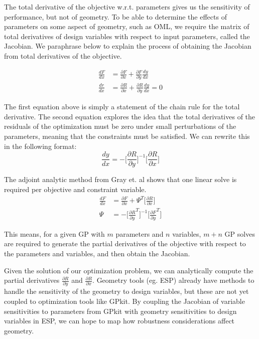 \documentclass[journal]{new-aiaa}
\begin{document}
The total derivative of the objective w.r.t. parameters gives us the sensitivity of performance,
but not of geometry. To be able to determine the effects of parameters on some aspect of geometry,
such as OML, we require the matrix of total derivatives of design variables with respect to input parameters,
called the Jacobian. We paraphrase \cite{Martins2013} below to explain
the process of obtaining the Jacobian from total derivatives of the objective. 

\begin{equation}
\begin{split}
\frac{dF}{dx} &= \frac{\partial F}{\partial x} + \frac{\partial F}{\partial y} \frac{dy}{dx}  \\ 
\frac{dr}{dx} &= \frac{\partial R}{\partial x} + \frac{\partial R}{\partial y} \frac{dy}{dx} = 0
\end{split}
\end{equation}

The first equation above is simply a statement of the chain rule for 
the total derivative. The second equation
explores the idea that the total derivatives of the residuals of the optimization must be zero under small
perturbations of the parameters, meaning that the constraints must be satisfied.
We can rewrite this in the following format:
\begin{equation}
\frac{dy}{dx} = - \Big[\frac{\partial R}{\partial y} \Big]^{-1} \Big[ \frac{\partial R}{\partial x} \Big] 
\end{equation}

The adjoint analytic method from Gray et. al 
shows that one linear solve is required per objective and constraint variable. 
\begin{equation}
\begin{split}
\frac{dF}{dx} &= \frac{\partial F}{\partial x} + \Psi^T\Big[\frac{\partial R}{\partial x}\Big] \\ 
\Psi &= - \Big[\frac{\partial R}{\partial y}^T \Big]^{-1} \Big[\frac{\partial F}{\partial y}^T\Big]
\end{split}
\end{equation}

This means, for a given GP with $m$ parameters and $n$ variables, $m+n$ GP solves are required to generate the partial derivatives of the objective with respect to the parameters and variables, and then obtain the Jacobian. 

Given the solution of
our optimization problem, we can analytically compute the partial derivatives $\frac{\partial R}{\partial y}$
and $\frac{\partial R}{\partial x}$.
Geometry tools (eg. ESP) already have methods to handle the sensitivity of the geometry to design variables,
but these are not yet coupled to optimization tools like GPkit. By coupling the Jacobian of variable sensitivities
to parameters from GPkit with geometry sensitivities to design variables in ESP, we can hope to map how
robustness considerations affect geometry. 
\end{document}
